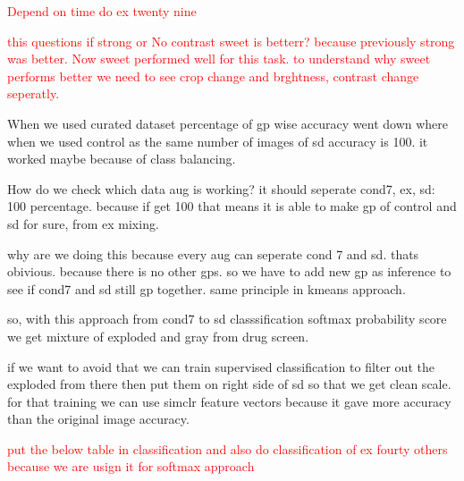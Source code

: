 \textcolor{red}{Depend on time do ex twenty nine}
  
\textcolor{red}{this questions if strong or No contrast sweet is betterr? because previously strong was better. Now sweet performed well for this task. 
to understand why sweet performs better we need to see crop change and brghtness, contrast change seperatly.}

When we used curated dataset percentage of gp wise accuracy went down where when we used control as the same number of images of sd accuracy is 100. 
it worked maybe because of class balancing.

How do we check which data aug is working?
it should seperate cond7, ex, sd: 100 percentage. because if get 100 that means it is able to make gp of control and sd for sure, from ex mixing.

why are we doing this because every aug can  seperate cond 7 and sd. thats obivious. because there is no other gps. so we have to add new gp as inference to see if 
cond7 and sd still gp together. same principle in kmeans approach.

so, with this approach from cond7 to sd classsification softmax probability score we get mixture of exploded and gray from drug screen.

if we want to avoid that we can train supervised classification to filter out the exploded from there then put them on right side of sd so that we get clean scale.
for that training we can use simclr feature vectors because it gave more accuracy than the original image accuracy.

\textcolor{red}{put the below table in classification and also do classification of ex fourty others because we are usign it for softmax approach} 

\begin{table}[H]
  \centering
  \caption{Performance metrics for different augmentation strategies before the projection head.}
  \label{tab:augmentation}
\end{table}

